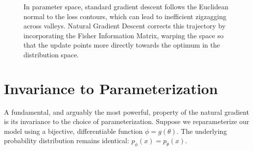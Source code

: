 \begin{figure}[ht]
\centering
{}
\caption{In parameter space, standard gradient descent follows the Euclidean normal to the loss contours, which can lead to inefficient zigzagging across valleys. Natural Gradient Descent corrects this trajectory by incorporating the Fisher Information Matrix, warping the space so that the update points more directly towards the optimum in the distribution space.}
\label{fig:ngd_vs_gd}
\end{figure}

\section{Invariance to Parameterization}

A fundamental, and arguably the most powerful, property of the natural gradient is its invariance to the choice of parameterization. Suppose we reparameterize our model using a bijective, differentiable function $\phi = g(\theta)$. The underlying probability distribution remains identical: $p_{\phi}(x) = p_{\theta}(x)$.

